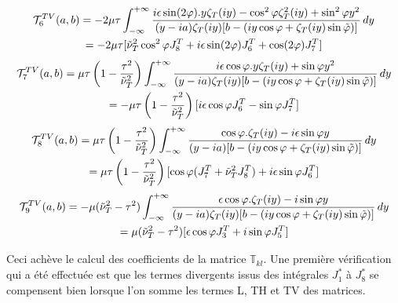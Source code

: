 \begin{multline}
\mathcal{T}_6^{TV}(a,b)=-2\mu\tau\int_{-\infty}^{+\infty} \frac{ i\epsilon\sin(2\varphi).y\zeta_T(iy)- \cos^2\varphi \zeta_T^2(iy)+ \sin^2\varphi y^2}{(y-ia)\zeta_T(iy)\lbrack b- (iy\cos \varphi+\zeta_T(iy)\sin\phiti) \rbrack} \, dy\\
\hfill=-2\mu\tau \lbrack \nuti_T^2\cos^2\varphi J_8^T+i\epsilon\sin(2\varphi)J_6^T+\cos(2\varphi)J_7^T \rbrack \hfill
\end{multline}
\begin{multline}
\mathcal{T}_7^{TV}(a,b)=\mu\tau\left(1-\frac{\tau^2}{\nuti_T^2}\right)\int_{-\infty}^{+\infty} \frac{ i\epsilon\cos\varphi.y\zeta_T(iy)+ \sin\varphi y^2}{(y-ia)\zeta_T(iy)\lbrack b- (iy\cos \varphi+\zeta_T(iy)\sin\phiti) \rbrack} \, dy \\
\hfill =-\mu\tau\left(1-\frac{\tau^2}{\nuti_T^2}\right) \lbrack i\epsilon\cos\varphi J_6^T-\sin\varphi J_7^T \rbrack \hfill
\end{multline}
\begin{multline}
\mathcal{T}_8^{TV}(a,b)=\mu\tau\left(1-\frac{\tau^2}{\nuti_T^2}\right)\int_{-\infty}^{+\infty} \frac{ \cos\varphi.\zeta_T(iy)-i\epsilon \sin\varphi y}{(y-ia)\lbrack b- (iy\cos \varphi+\zeta_T(iy)\sin\phiti) \rbrack} \, dy\\
\hfill=\mu\tau \left(1-\frac{\tau^2}{\nuti_T^2}\right)\lbrack\cos\varphi (J_7^T+\nuti_T^2J_8^T) +i\epsilon\sin\varphi J_6^T \rbrack \hfill
\end{multline}
\begin{multline}
\mathcal{T}_9^{TV}(a,b)=-\mu(\nuti_T^2-\tau^2)\int_{-\infty}^{+\infty} \frac{ \epsilon\cos\varphi.\zeta_T(iy)- i\sin\varphi y}{(y-ia)\zeta_T(iy)\lbrack b- (iy\cos \varphi+\zeta_T(iy)\sin\phiti) \rbrack} \, dy\\
\hfill=\mu(\nuti_T^2-\tau^2)\lbrack \epsilon\cos\varphi J_3^T+i\sin\varphi  J_5^T \rbrack \hfill
\end{multline}

Ceci achève le calcul des coefficients de la matrice $\mathbb{T}_{kl}$. Une première vérification qui a été effectuée est que les termes divergents issus des intégrales $J_1^*$ à $J_8^*$ se compensent bien lorsque l'on somme les termes L, TH et TV des matrices.